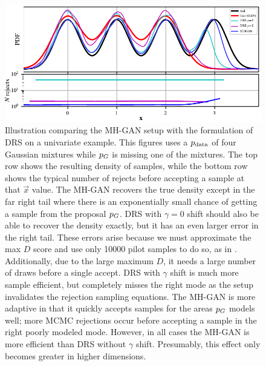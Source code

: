 \begin{figure}[htbp]
    \centering
    \includegraphics[scale=1.0]{figures/univariate_example.pdf}
    \caption{{\small
    Illustration comparing the MH-GAN setup with the formulation of DRS on a univariate example.
    This figures uses a ${p_{\textrm{data}}}$ of four Gaussian mixtures while ${p_G}$ is missing one of the mixtures.
    The top row shows the resulting density of samples, while the bottom row shows the typical number of rejects before accepting a sample at that $\vec x$ value.
    The MH-GAN recovers the true density except in the far right tail where there is an exponentially small chance of getting a sample from the proposal ${p_G}$.
    DRS with $\gamma=0$ shift should also be able to recover the density exactly, but it has an even larger error in the right tail.
    These errors arise because we must approximate the max $D$ score and use only \num{10000} pilot samples to do so, as in \citet{Azadi2018}.
    Additionally, due to the large maximum $D$, it needs a large number of draws before a single accept.
    DRS with $\gamma$ shift is much more sample efficient, but completely misses the right mode as the setup invalidates the rejection sampling equations.
    The MH-GAN is more adaptive in that it quickly accepts samples for the areas ${p_G}$ models well; more MCMC rejections occur before accepting a sample in the right poorly modeled mode.
    However, in all cases the MH-GAN is more efficient than DRS without $\gamma$ shift.
    Presumably, this effect only becomes greater in higher dimensions.
    }}
    \label{fig:univariate_example}
\end{figure}

